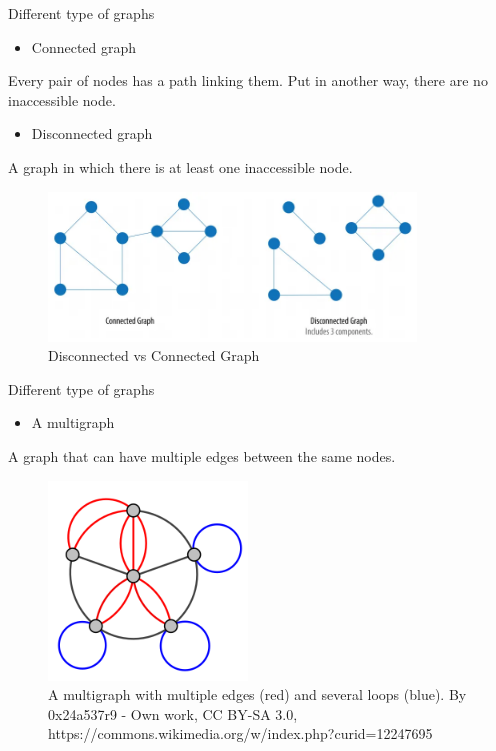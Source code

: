 \documentclass[ignorenonframetext,]{beamer}
\providecommand{\tightlist}{%
  \setlength{\itemsep}{0pt}\setlength{\parskip}{0pt}}
\begin{document}
\begin{frame}{Different type of graphs}
\protect\hypertarget{different-type-of-graphs-3}{}

\begin{itemize}
\tightlist
\item
  Connected graph
\end{itemize}

Every pair of nodes has a path linking them. Put in another way, there
are no inaccessible node.

\begin{itemize}
\tightlist
\item
  Disconnected graph
\end{itemize}

A graph in which there is at least one inaccessible node.

\begin{figure}
\centering
\includegraphics[width=\textwidth,height=1.5625in]{disconnected-connected.png}
\caption{Disconnected vs Connected Graph}
\end{figure}

\end{frame}

\begin{frame}{Different type of graphs}
\protect\hypertarget{different-type-of-graphs-4}{}

\begin{itemize}
\tightlist
\item
  A multigraph
\end{itemize}

A graph that can have multiple edges between the same nodes.

\begin{figure}
\centering
\includegraphics[width=\textwidth,height=2.08333in]{Multi-pseudograph.png}
\caption{A multigraph with multiple edges (red) and several loops
(blue). By 0x24a537r9 - Own work, CC BY-SA 3.0,
https://commons.wikimedia.org/w/index.php?curid=12247695}
\end{figure}

\end{frame}
\end{document}
